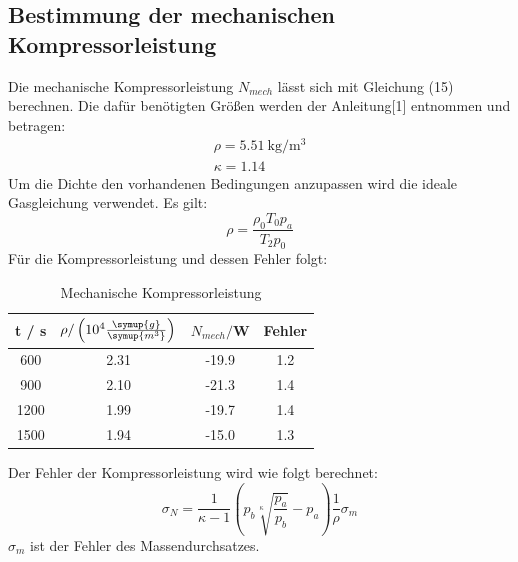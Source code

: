 \subsection{Bestimmung der mechanischen Kompressorleistung}
Die mechanische Kompressorleistung $N_{mech}$ lässt sich mit Gleichung (15) berechnen. Die dafür
benötigten Größen werden der Anleitung[1] entnommen und betragen:
\begin{align*}
  \rho = \SI{5.51}{\kilo\gram\per\cubic\meter} \\
  \kappa = 1.14
\end{align*}
Um die Dichte den vorhandenen Bedingungen anzupassen wird die ideale Gasgleichung
verwendet. Es gilt:
\begin{equation}
  \rho = \frac{\rho_0 T_0 p_a}{T_2 p_0}
\end{equation}
Für die Kompressorleistung und dessen Fehler folgt:
\begin{table}
  \centering
  \caption{Mechanische Kompressorleistung}
  \label{tab:Mechanische Kompressorleistung}
  \begin{tabular}{c c c c}
    \toprule
    t / s  &$\rho/\left(10^{4}\frac{\symup{g}}{\symup{m^3}}\right)$ & $N_{mech}/$W & Fehler \\
    \midrule
     600 & 2.31 & -19.9 & 1.2 \\
     900 & 2.10 & -21.3 & 1.4 \\
    1200 & 1.99 & -19.7 & 1.4 \\
    1500 & 1.94 & -15.0 & 1.3 \\
    \bottomrule
  \end{tabular}
\end{table}

Der Fehler der Kompressorleistung wird wie folgt berechnet:
\begin{equation}
  \sigma_N = \frac{1}{\kappa -1} \left(p_b \sqrt[\kappa]{\frac{p_a}{p_b}}-p_a\right)\frac{1}{\rho} \sigma_m
\end{equation}
$\sigma_m$ ist der Fehler des Massendurchsatzes.
